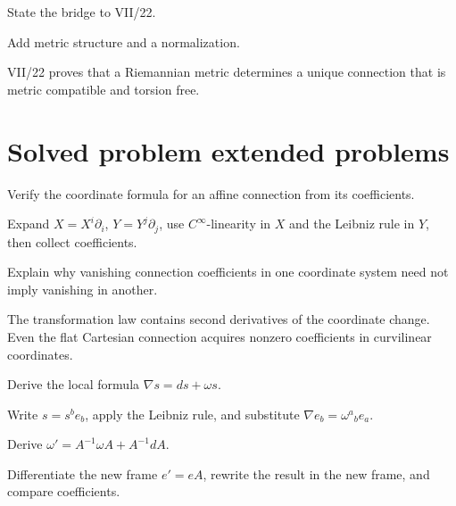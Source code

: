 \begin{exercise}\label{exr:vii21-24}
State the bridge to VII/22.
\end{exercise}
\begin{hint}
Add metric structure and a normalization.
\end{hint}
\begin{solution}
VII/22 proves that a Riemannian metric determines a unique connection that is metric compatible and torsion free.
\end{solution}

\section{Solved problem extended problems}

\begin{problem}\label{prob:vii21-01}
Verify the coordinate formula for an affine connection from its coefficients.
\end{problem}
\begin{solution}
Expand \(X=X^i\partial_i\), \(Y=Y^j\partial_j\), use \(C^\infty\)-linearity in \(X\) and the Leibniz rule in \(Y\), then collect coefficients.
\end{solution}

\begin{problem}\label{prob:vii21-02}
Explain why vanishing connection coefficients in one coordinate system need not imply vanishing in another.
\end{problem}
\begin{solution}
The transformation law contains second derivatives of the coordinate change. Even the flat Cartesian connection acquires nonzero coefficients in curvilinear coordinates.
\end{solution}

\begin{problem}\label{prob:vii21-03}
Derive the local formula \(\nabla s=ds+\omega s\).
\end{problem}
\begin{solution}
Write \(s=s^be_b\), apply the Leibniz rule, and substitute \(\nabla e_b=\omega^a{}_b e_a\).
\end{solution}

\begin{problem}\label{prob:vii21-04}
Derive \(\omega'=A^{-1}\omega A+A^{-1}dA\).
\end{problem}
\begin{solution}
Differentiate the new frame \(e'=eA\), rewrite the result in the new frame, and compare coefficients.
\end{solution}

